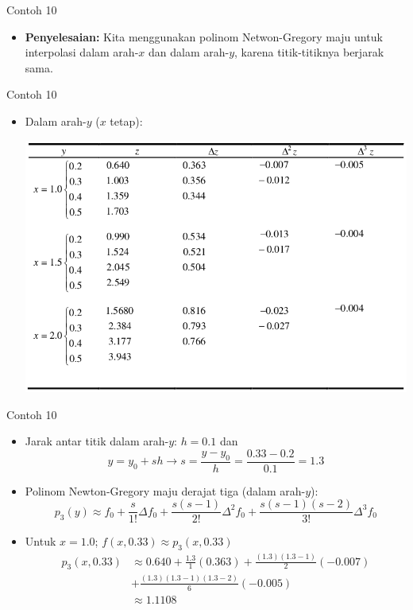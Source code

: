 \documentclass[pdflatex,compress,mathserif]{beamer}
\begin{document}
\begin{frame}{Contoh 10}
	\begin{itemize}
		\item \textbf{Penyelesaian:} Kita menggunakan polinom Netwon-Gregory maju untuk interpolasi dalam arah-$ x $ dan dalam arah-$ y $, karena titik-titiknya berjarak sama.
	\end{itemize}
\end{frame}

\begin{frame}{Contoh 10}
	\begin{itemize}
		\item Dalam arah-$ y $ ($ x $ tetap):
		\begin{center}
			\includegraphics[width=0.8\linewidth]{img/img30}
		\end{center}
	\end{itemize}
\end{frame}

\begin{frame}{Contoh 10}
	\begin{itemize}
		\item Jarak antar titik dalam arah-$ y $: $ h = 0.1 $ dan \[ y = y_0 + sh \rightarrow s = \frac{y-y_0}{h} = \frac{0.33-0.2}{0.1}=1.3 \]
		\item Polinom Newton-Gregory maju derajat tiga (dalam arah-$ y $): \[ p_3(y) \approx f_0 + \frac{s}{1!} \Delta f_0 + \frac{s(s-1)}{2!} \Delta^2 f_0 + \frac{s(s-1)(s-2)}{3!} \Delta^3 f_0 \]
		\item Untuk $ x = 1.0 $; $ f(x, 0.33) \approx p_3 (x, 0.33) $
		\begin{align*}
			p_3(x,0.33) &\approx 0.640 + \frac{1.3}{1}(0.363) + \frac{(1.3)(1.3-1)}{2}(-0.007)\\
			&+ \frac{(1.3)(1.3-1)(1.3-2)}{6}(-0.005) \\
			& \approx 1.1108
		\end{align*}
	\end{itemize}
\end{frame}
\end{document}
